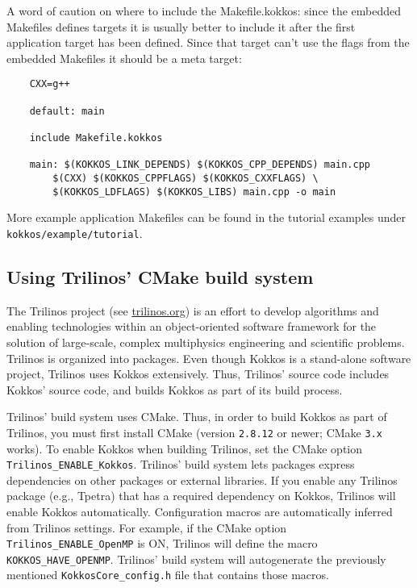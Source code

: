     A word of caution on where to include the Makefile.kokkos:
    since the embedded Makefiles defines targets it is usually
    better to include it after the first application target
    has been defined. Since that target can't use the flags
    from the embedded Makefiles it should be a meta target:

\begin{lstlisting}    
    CXX=g++
    
    default: main
    
    include Makefile.kokkos
    
    main: $(KOKKOS_LINK_DEPENDS) $(KOKKOS_CPP_DEPENDS) main.cpp
        $(CXX) $(KOKKOS_CPPFLAGS) $(KOKKOS_CXXFLAGS) \
        $(KOKKOS_LDFLAGS) $(KOKKOS_LIBS) main.cpp -o main
\end{lstlisting}

More example application Makefiles can be found in the tutorial examples under \verb!kokkos/example/tutorial!.

\subsection{Using Trilinos' CMake build system}\label{S:build:Trilinos}

The Trilinos project (see \url{trilinos.org}) is an effort to develop
algorithms and enabling technologies within an object-oriented
software framework for the solution of large-scale, complex
multiphysics engineering and scientific problems.  Trilinos is
organized into packages.  Even though Kokkos is a stand-alone software
project, Trilinos uses Kokkos extensively.  Thus, Trilinos' source
code includes Kokkos' source code, and builds Kokkos as part of its
build process.

Trilinos' build system uses CMake.  Thus, in order to build Kokkos as
part of Trilinos, you must first install CMake (version
\texttt{2.8.12} or newer; CMake \texttt{3.x} works).  
To enable Kokkos when building Trilinos, set the CMake option \verb!Trilinos_ENABLE_Kokkos!.
Trilinos' build system lets packages express dependencies on other packages or external libraries.
If you enable any Trilinos package (e.g., Tpetra) that has a required dependency on Kokkos, 
Trilinos will enable Kokkos automatically.
Configuration macros are automatically inferred from Trilinos settings. 
For example, if the CMake option \lstinline|Trilinos_ENABLE_OpenMP| is ON, Trilinos will define the macro \lstinline|KOKKOS_HAVE_OPENMP|.
Trilinos' build system will autogenerate the previously mentioned \lstinline|KokkosCore_config.h| file that contains those macros. 

